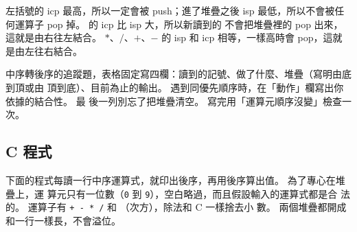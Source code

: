 左括號的 icp 最高，所以一定會被 push；進了堆疊之後 isp 最低，所以不會被任何運算子
pop 掉。 \sqpow{} 的 icp 比 isp 大，所以新讀到的 \sqpow{} 不會把堆疊裡的 \sqpow{}
pop 出來，這就是由右往左結合。 $*$、$/$、$+$、$-$ 的 isp 和 icp 相等，一樣高時會
pop，這就是由左往右結合。

\begin{examnote}
中序轉後序的追蹤題，表格固定寫四欄：讀到的記號、做了什麼、堆疊（寫明由底到頂或由
頂到底）、目前為止的輸出。 遇到同優先順序時，在「動作」欄寫出你依據的結合性。 最
後一列別忘了把堆疊清空。 寫完用「運算元順序沒變」檢查一次。
\end{examnote}

\subsection{C 程式}

下面的程式每讀一行中序運算式，就印出後序，再用後序算出值。 為了專心在堆疊上，運
算元只有一位數（\texttt{0} 到 \texttt{9}），空白略過，而且假設輸入的運算式都是合
法的。 運算子有 \texttt{+ - * /} 和 \texttt{\sqpow}（次方），除法和 C 一樣捨去小
數。 兩個堆疊都開成和一行一樣長，不會溢位。

